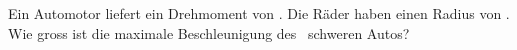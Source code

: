 Ein Automotor liefert ein Drehmoment von \MAuO. Die Räder haben einen Radius von \rAuO. Wie gross ist die maximale Beschleunigung des \mAuO\ schweren Autos?
